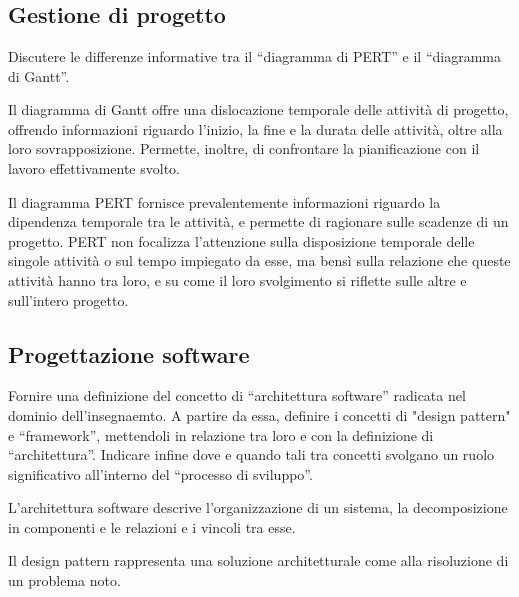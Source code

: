 \section{}

\subsection{Gestione di progetto}

\begin{question}
  Discutere le differenze informative tra il ``diagramma di PERT'' e il
  ``diagramma di Gantt''.
\end{question}

Il diagramma di Gantt offre una dislocazione temporale delle attività di
progetto, offrendo informazioni riguardo l'inizio, la fine e la durata delle
attività, oltre alla loro sovrapposizione. Permette, inoltre, di confrontare la
pianificazione con il lavoro effettivamente svolto.

Il diagramma PERT fornisce prevalentemente informazioni riguardo la
dipendenza temporale tra le attività, e permette di ragionare sulle scadenze di
un progetto. PERT non focalizza l'attenzione sulla disposizione temporale delle
singole attività o sul tempo impiegato da esse, ma bensì sulla relazione che
queste attività hanno tra loro, e su come il loro svolgimento si riflette sulle
altre e sull'intero progetto.

\subsection{Progettazione software}

\begin{question}
  Fornire una definizione del concetto di ``architettura software'' radicata nel
  dominio dell'insegnaemto. A partire da essa, definire i concetti di "design
  pattern" e ``framework'', mettendoli in relazione tra loro e con la
  definizione di ``architettura''. Indicare infine dove e quando tali tra concetti
  svolgano un ruolo significativo all'interno del ``processo di sviluppo''.
\end{question}

L'architettura software descrive l'organizzazione di un sistema, la
decomposizione in componenti e le relazioni e i vincoli tra esse.

Il design pattern rappresenta una soluzione architetturale come
 alla risoluzione di un problema noto.


